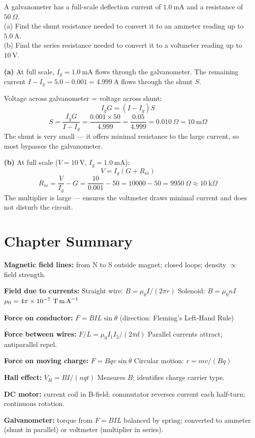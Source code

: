 \begin{examplebox}[25.4]
A galvanometer has a full-scale deflection current
of $1.0\ \text{mA}$ and a resistance of
$50\ \Omega$.\\
(a) Find the shunt resistance needed to convert it
to an ammeter reading up to $5.0\ \text{A}$.\\
(b) Find the series resistance needed to convert it
to a voltmeter reading up to $10\ \text{V}$.
\end{examplebox}

\begin{solutionbox}
\textbf{(a)} At full scale, $I_g = 1.0\ \text{mA}$
flows through the galvanometer. The remaining current
$I - I_g = 5.0 - 0.001 = 4.999\ \text{A}$ flows
through the shunt $S$.

Voltage across galvanometer = voltage across shunt:
\[
  I_g G = (I-I_g)S
\]
\[
  S = \frac{I_g G}{I - I_g}
  = \frac{0.001 \times 50}{4.999}
  = \frac{0.05}{4.999}
  = 0.010\ \Omega = 10\ \text{m}\Omega
\]
The shunt is very small --- it offers minimal
resistance to the large current, so most bypasses
the galvanometer.

\textbf{(b)} At full scale ($V = 10\ \text{V}$,
$I_g = 1.0\ \text{mA}$):
\[
  V = I_g(G + R_m)
\]
\[
  R_m = \frac{V}{I_g} - G
  = \frac{10}{0.001} - 50
  = 10000 - 50 = 9950\ \Omega
  \approx 10\ \text{k}\Omega
\]
The multiplier is large --- ensures the voltmeter
draws minimal current and does not disturb the circuit.
\end{solutionbox}

\section{Chapter Summary}

\begin{summarybox}
\textbf{Magnetic field lines:} from N to S outside
magnet; closed loops; density $\propto$ field strength.

\textbf{Field due to currents:}
Straight wire: $B = \mu_0 I/(2\pi r)$
Solenoid: $B = \mu_0 nI$
$\mu_0 = 4\pi\times10^{-7}\ \text{T\,m\,A}^{-1}$

\textbf{Force on conductor:}
$F = BIL\sin\theta$ (direction: Fleming's Left-Hand Rule)

\textbf{Force between wires:}
$F/L = \mu_0 I_1 I_2/(2\pi d)$
Parallel currents attract; antiparallel repel.

\textbf{Force on moving charge:}
$F = Bqv\sin\theta$
Circular motion: $r = mv/(Bq)$

\textbf{Hall effect:}
$V_H = BI/(nqt)$
Measures $B$; identifies charge carrier type.

\textbf{DC motor:} current coil in B-field;
commutator reverses current each half-turn;
continuous rotation.

\textbf{Galvanometer:} torque from $F = BIL$
balanced by spring; converted to ammeter (shunt
in parallel) or voltmeter (multiplier in series).
\end{summarybox}


